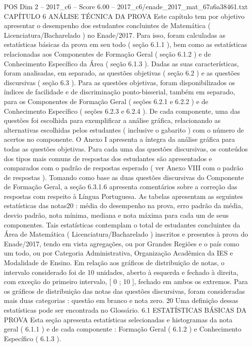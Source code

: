 \begin{textsample}{POS Dim 2 – 2017\_c6 – Score 6.00 – 2017\_c6/enade\_2017\_mat\_67a6a38461.txt}  \label{ex:f2_pos_265}
CAPÍTULO 6 ANÁLISE TÉCNICA DA PROVA Este capítulo tem por objetivo apresentar o desempenho dos estudantes concluintes de Matemática ( Licenciatura/Bacharelado ) no Enade/2017.
Para isso, foram calculadas as estatísticas básicas da prova em seu todo ( seção 6.1.1 ), bem como as estatísticas relacionadas aos Componentes de Formação Geral ( seção 6.1.2 ) e de Conhecimento Específico da Área ( seção 6.1.3 ).
Dadas as suas características, foram analisadas, em separado, as questões objetivas ( seção 6.2 ) e as questões discursivas ( seção 6.3 ).
Para as questões objetivas, foram disponibilizados os índices de facilidade e de discriminação ponto-bisserial, também em separado, para os Componentes de Formação Geral ( seções 6.2.1 e 6.2.2 ) e de Conhecimento Específico ( seções 6.2.3 e 6.2.4 ).
De cada componente, uma das questões foi escolhida para exemplificar a análise gráfica, relacionando as alternativas escolhidas pelos estudantes ( inclusive o gabarito ) com o número de acertos no componente.
O Anexo I apresenta a íntegra da análise gráfica para todas as questões objetivas.
Para cada uma das questões discursivas, os conteúdos dos tipos mais comuns de respostas dos estudantes são apresentados e comparados com o padrão de respostas esperado ( ver Anexo VIII com o padrão de respostas ).
Tomando como base as duas questões discursivas do Componente de Formação Geral, a seção 6.3.1.6 apresenta comentários sobre a correção das respostas com respeito à Língua Portuguesa.
As tabelas apresentam as seguintes estatísticas das notas20 : média do desempenho na prova, erro padrão da média, desvio padrão, nota mínima, mediana e nota máxima para cada um de seus componentes.
Tais estatísticas contemplam o total de estudantes concluintes da Área de Matemática ( Licenciatura/Bacharelado ) inscritos e presentes à prova do Enade/2017, tendo em vista agregações, ou por Grandes Regiões e o país como um todo, ou por Categoria Administrativa, Organização Acadêmica da IES e Modalidade de Ensino.
Em relação aos gráficos de distribuição de notas, o intervalo considerado foi de 10 unidades, aberto à esquerda e fechado à direita, com exceção do primeiro intervalo, [ 0 ; 10 ], fechado em ambos os extremos.
Para os gráficos de distribuição das notas das questões discursivas, foram consideradas mais duas categorias : questão em branco e nota zero. 20 Uma definição dessas estatísticas pode ser encontrada no Glossário. 6.1 ESTATÍSTICAS BÁSICAS DA PROVA Esta seção apresenta estatísticas selecionadas e histogramas da nota geral ( 6.1.1 ) e de cada componente : Formação Geral ( 6.1.2 ) e Conhecimento Específico ( 6.1.3 ).

\end{textsample}
